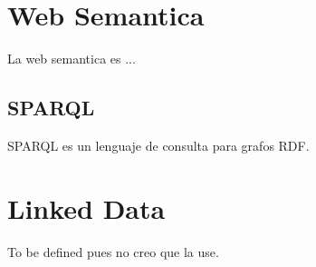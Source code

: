 \section{Web Semantica}
\label{sec:MT_WSemantica}

La web semantica es ...

\subsection{SPARQL}
SPARQL es un lenguaje de consulta para grafos RDF.

\section{Linked Data}
\label{sec:MT_LinkedData}
To be defined pues no creo que la use.